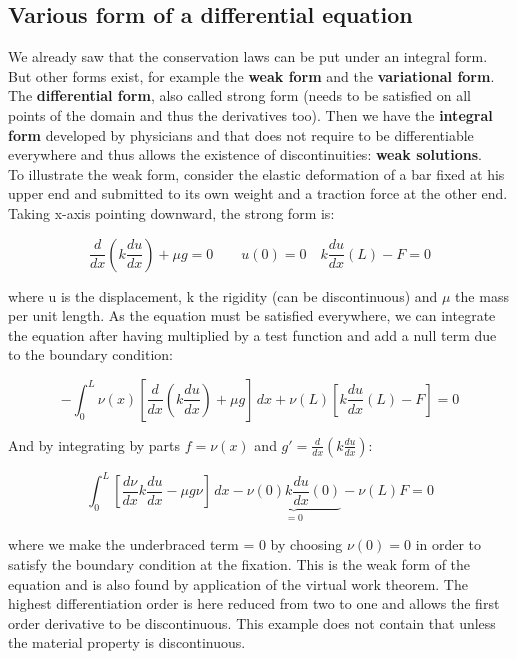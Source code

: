 \subsection{Various form of a differential equation}
We already saw that the conservation laws can be put under an integral form. But other forms exist, for example the \textbf{weak form} and the \textbf{variational form}. \\

The \textbf{differential form}, also called strong form (needs to be satisfied on all points of the domain and thus the derivatives too). Then we have the \textbf{integral form} developed by physicians and that does not require to be differentiable everywhere and thus allows the existence of discontinuities: \textbf{weak solutions}. \\

To illustrate the weak form, consider the elastic deformation of a bar fixed at his upper end and submitted to its own weight and a traction force at the other end. Taking x-axis pointing downward, the strong form is: 

\begin{equation}
\frac{d}{dx} \left( k\frac{du}{dx} \right) + \mu g = 0 \qquad u(0) = 0 \quad k\frac{du}{dx}(L) - F = 0
\end{equation} 

where u is the displacement, k the rigidity (can be discontinuous) and $\mu$ the mass per unit length. As the equation must be satisfied everywhere, we can integrate the equation after having multiplied by a test function and add a null term due to the boundary condition: 

\begin{equation}
-\int _0^L \nu (x) \left[ \frac{d}{dx} \left( k\frac{du}{dx} \right)+ \mu g\right]\, dx + \nu (L) \left[ k \frac{du}{dx}(L) - F \right] = 0
\end{equation}

And by integrating by parts $f = \nu (x)$ and $g' = \frac{d}{dx}(k\frac{du}{dx})$: 

\begin{equation}
\int _0 ^L \left[\frac{d\nu}{dx} k \frac{du}{dx} - \mu g \nu \right]\, dx - \underbrace{\nu (0)k\frac{du}{dx}(0)}_{=0} -\nu (L) F = 0
\end{equation}

where we make the underbraced term = 0 by choosing $\nu(0)=0$ in order to satisfy the boundary condition at the fixation. This is the weak form of the equation and is also found by application of the virtual work theorem. The highest differentiation order is here reduced from two to one and allows the first order derivative to be discontinuous. This example does not contain that unless the material property is discontinuous. \\

